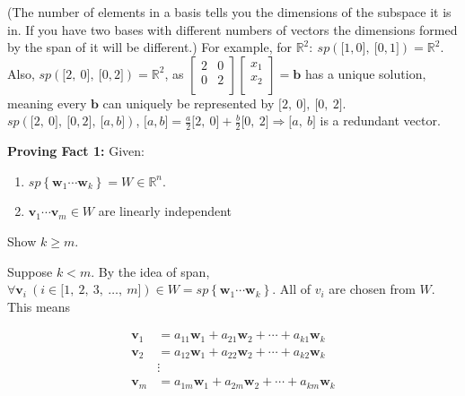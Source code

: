 \documentclass[12pt]{article}
\theoremstyle{plain}
\theoremstyle{remark}
\theoremstyle{definition}
\begin{document}
(The number of elements in a basis tells you the dimensions of the
subspace it is in. If you have two bases with different numbers of
vectors the dimensions formed by the span of it will be different.) For
example, for
\(\mathbb{R}^{2}:\ sp\left( \lbrack 1,0\rbrack,\ \lbrack 0,1\rbrack \right) = \mathbb{R}^{2}\).
Also,
\(sp\left( \lbrack 2,\ 0\rbrack,\ \lbrack 0,2\rbrack \right) = \mathbb{R}^{2}\),
as \(\begin{bmatrix}
2 & 0 \\
0 & 2 \\
\end{bmatrix}\begin{bmatrix}
x_{1} \\
x_{2} \\
\end{bmatrix} = \mathbf{b}\) has a unique solution, meaning every
\(\mathbf{b}\) can uniquely be represented by
\(\lbrack 2,\ 0\rbrack,\ \lbrack 0,\ 2\rbrack\).
\(sp\left( \lbrack 2,\ 0\rbrack,\ \lbrack 0,2\rbrack,\ \lbrack a,b\rbrack \right)\),
\(\lbrack a,b\rbrack = \frac{a}{2}\lbrack 2,\ 0\rbrack + \frac{b}{2}\lbrack 0,\ 2\rbrack \Rightarrow \lbrack a,\ b\rbrack\)
is a redundant vector.

\textbf{Proving Fact 1:} Given:

\begin{enumerate}
\def\labelenumi{\arabic{enumi}.}
\item
  \(sp\left\{ {\mathbf{w}}_{1}\cdots{\mathbf{w}}_{k} \right\} = W \in \mathbb{R}^{n}\).
\item
  \({\mathbf{v}}_{1}\cdots{\mathbf{v}}_{m} \in W\) are linearly
  independent
\end{enumerate}

Show \(k \geq m\).

Suppose \(k < m\). By the idea of span,
\(\forall{\mathbf{v}}_{i}\ \left( i \in \lbrack 1,\ 2,\ 3,\ \ldots,\ m\rbrack \right) \in W = sp\left\{ {\mathbf{w}}_{1}\cdots{\mathbf{w}}_{k} \right\}\).
All of \(v_{i}\) are chosen from \(W\). This means

\begin{align*}
{\mathbf{v}}_{1} &= a_{11}{\mathbf{w}}_{1} + a_{21}{\mathbf{w}}_{2} + \cdots + a_{k1}{\mathbf{w}}_{k} \\
{\mathbf{v}}_{2} &= a_{12}{\mathbf{w}}_{1} + a_{22}{\mathbf{w}}_{2} + \cdots + a_{k2}{\mathbf{w}}_{k} \\
&\vdots  \\
{\mathbf{v}}_{m} &= a_{1m}{\mathbf{w}}_{1} + a_{2m}{\mathbf{w}}_{2} + \cdots + a_{km}{\mathbf{w}}_{k}
\end{align*}
\end{document}
